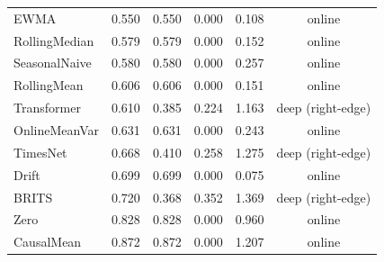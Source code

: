 \begin{table}[tbp]
\begin{tabular}{@{}lccccc@{}}
EWMA & 0.550 & 0.550 & 0.000 & 0.108 & online \\
RollingMedian & 0.579 & 0.579 & 0.000 & 0.152 & online \\
SeasonalNaive & 0.580 & 0.580 & 0.000 & 0.257 & online \\
RollingMean & 0.606 & 0.606 & 0.000 & 0.151 & online \\
Transformer & 0.610 & 0.385 & 0.224 & 1.163 & deep (right-edge) \\
OnlineMeanVar & 0.631 & 0.631 & 0.000 & 0.243 & online \\
TimesNet & 0.668 & 0.410 & 0.258 & 1.275 & deep (right-edge) \\
Drift & 0.699 & 0.699 & 0.000 & 0.075 & online \\
BRITS & 0.720 & 0.368 & 0.352 & 1.369 & deep (right-edge) \\
Zero & 0.828 & 0.828 & 0.000 & 0.960 & online \\
CausalMean & 0.872 & 0.872 & 0.000 & 1.207 & online \\
\bottomrule
\end{tabular}
\end{table}
